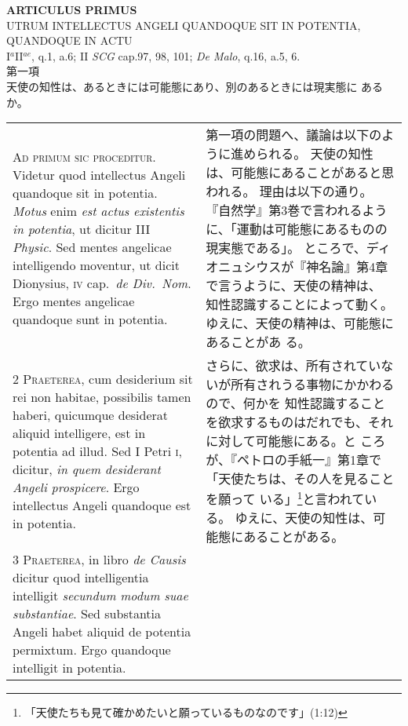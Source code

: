 \documentclass[10pt]{jsarticle} %
\begin{document}
\newpage

\begin{center}
 {\Large {\bf ARTICULUS PRIMUS}}\\
 {\large UTRUM INTELLECTUS ANGELI QUANDOQUE SIT IN POTENTIA, QUANDOQUE
 IN ACTU}\\
 {\footnotesize I$^a$II$^{ae}$, q.1, a.6; II {\itshape SCG} cap.97, 98,
 101; {\itshape De Malo}, q.16, a.5, 6.}\\
 {\Large 第一項\\天使の知性は、あるときには可能態にあり、別のあるときには現実態に
	あるか。}
\end{center}

\begin{longtable}{p{21em}p{21em}}

{\Huge A}{\scshape d primum sic proceditur}. Videtur quod
intellectus Angeli quandoque sit in potentia. {\itshape Motus} enim {\itshape est actus
existentis in potentia}, ut dicitur III {\itshape Physic}. Sed mentes angelicae
intelligendo moventur, ut dicit Dionysius, {\scshape iv} cap.~{\itshape de Div.~Nom}. Ergo
mentes angelicae quandoque sunt in potentia.


&

第一項の問題へ、議論は以下のように進められる。
天使の知性は、可能態にあることがあると思われる。
理由は以下の通り。
『自然学』第3巻で言われるように、「運動は可能態にあるものの現実態である」。
ところで、ディオニュシウスが『神名論』第4章で言うように、天使の精神は、
知性認識することによって動く。ゆえに、天使の精神は、可能態にあることがあ
る。

\\


{\scshape 2 Praeterea}, cum desiderium sit rei non
habitae, possibilis tamen haberi, quicumque desiderat aliquid
intelligere, est in potentia ad illud. Sed I Petri {\scshape i}, dicitur, {\itshape in quem
desiderant Angeli prospicere}. Ergo intellectus Angeli quandoque est in
potentia.


&

さらに、欲求は、所有されていないが所有されうる事物にかかわるので、何かを
 知性認識することを欲求するものはだれでも、それに対して可能態にある。と
 ころが、『ペトロの手紙一』第1章で「天使たちは、その人を見ることを願って
 いる」\footnote{「天使たちも見て確かめたいと願っているものなのです」(1:12)}と言われている。
ゆえに、天使の知性は、可能態にあることがある。

\\


{\scshape 3 Praeterea}, in libro {\itshape de Causis} dicitur quod
intelligentia intelligit {\itshape secundum modum suae substantiae}. Sed substantia
Angeli habet aliquid de potentia permixtum. Ergo quandoque intelligit in
potentia.



\end{longtable}
\end{document}
